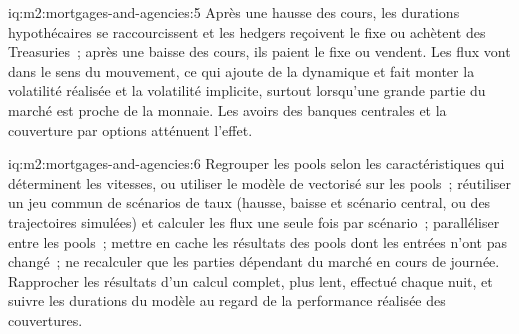 \begin{solution}{iq:m2:mortgages-and-agencies:5}
Après une hausse des cours, les durations hypothécaires se raccourcissent et les hedgers reçoivent le fixe ou achètent
des Treasuries~; après une baisse des cours, ils paient le fixe ou vendent. Les flux vont dans le sens
du mouvement, ce qui ajoute de la dynamique et fait monter la volatilité réalisée et la volatilité implicite,
surtout lorsqu'une grande partie du marché est proche de la monnaie. Les avoirs des banques
centrales et la couverture par options atténuent l'effet.
\end{solution}

\begin{solution}{iq:m2:mortgages-and-agencies:6}
Regrouper les pools selon les caractéristiques qui déterminent les vitesses, ou utiliser le modèle de 
vectorisé sur les pools~; réutiliser un jeu commun de scénarios de taux (hausse, baisse et scénario central,
ou des trajectoires simulées) et calculer les flux une seule fois par scénario~; paralléliser entre
les pools~; mettre en cache les résultats des pools dont les entrées n'ont pas changé~; ne recalculer que les
parties dépendant du marché en cours de journée. Rapprocher les résultats d'un calcul complet, plus lent, effectué chaque nuit,
et suivre les durations du modèle au regard de la performance réalisée des couvertures.
\end{solution}
